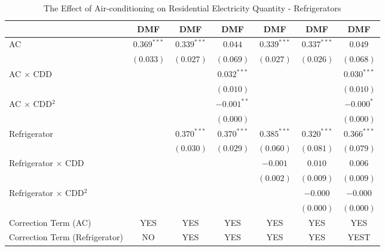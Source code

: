 
\begin{table}[htbp]
\caption{The Effect of Air-conditioning on Residential Electricity Quantity - Refrigerators}
\begin{center}
\begin{tabular}{l c c c c c c}
\hline
 & DMF & DMF & DMF & DMF & DMF & DMF \\
\hline
AC                             & $0.369^{***}$ & $0.339^{***}$ & $0.044$       & $0.339^{***}$ & $0.337^{***}$ & $0.049$       \\
                               & $(0.033)$     & $(0.027)$     & $(0.069)$     & $(0.027)$     & $(0.026)$     & $(0.068)$     \\
AC $\times$ CDD                &               &               & $0.032^{***}$ &               &               & $0.030^{***}$ \\
                               &               &               & $(0.010)$     &               &               & $(0.010)$     \\
AC $\times$ CDD$^2$            &               &               & $-0.001^{**}$ &               &               & $-0.000^{*}$  \\
                               &               &               & $(0.000)$     &               &               & $(0.000)$     \\
Refrigerator                   &               & $0.370^{***}$ & $0.370^{***}$ & $0.385^{***}$ & $0.320^{***}$ & $0.366^{***}$ \\
                               &               & $(0.030)$     & $(0.029)$     & $(0.060)$     & $(0.081)$     & $(0.079)$     \\
Refrigerator $\times$ CDD      &               &               &               & $-0.001$      & $0.010$       & $0.006$       \\
                               &               &               &               & $(0.002)$     & $(0.009)$     & $(0.009)$     \\
Refrigerator $\times$ CDD$^2$  &               &               &               &               & $-0.000$      & $-0.000$      \\
                               &               &               &               &               & $(0.000)$     & $(0.000)$     \\
\hline
Correction Term (AC)           & YES           & YES           & YES           & YES           & YES           & YES           \\
Correction Term (Refrigerator) & NO            & YES           & YES           & YES           & YES           & YEST          \\

\end{tabular}
\end{center}
\end{table}
